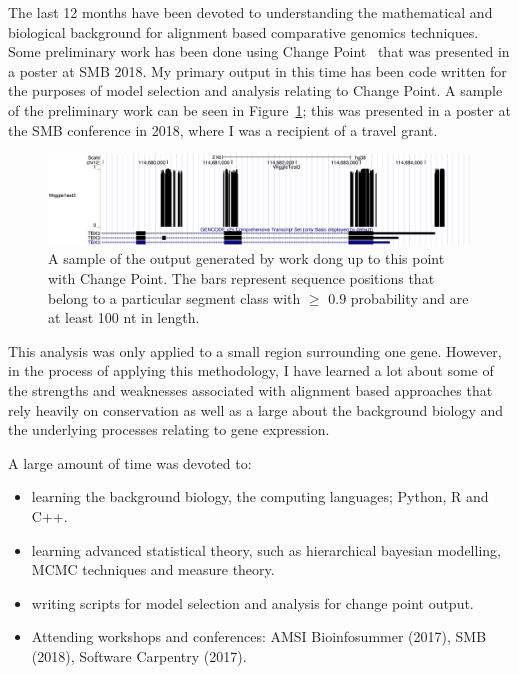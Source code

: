 
The last 12 months have been devoted to understanding the mathematical and biological background for alignment based comparative genomics techniques. Some preliminary work has been done using Change Point~\cite{keith2006segmenting} that was presented in a poster at SMB 2018. My primary output in this time has been code written for the purposes of model selection and analysis relating to Change Point. A sample of the preliminary work can be seen in Figure~\ref{fig:wigglel}; this was presented in a poster at the SMB conference in 2018, where I was a recipient of a travel grant.

\begin{figure}[H]
    \centering
    \includegraphics[width = \textwidth]{WiggleTrack1.pdf}
    \caption{A sample of the output generated by work dong up to this point with Change Point. The bars represent sequence positions that belong to a particular segment class with $\geq$ 0.9 probability and are at least 100 nt in length.}
    \label{fig:wigglel}
\end{figure}

This analysis was only applied to a small region surrounding one gene. However, in the process of applying this methodology, I have learned a lot about some of the strengths and weaknesses associated with alignment based approaches that rely heavily on conservation as well as a large about the background biology and the underlying processes relating to gene expression. 

A large amount of time was devoted to:
  \begin{itemize}
        \item learning the background biology, the computing languages; Python, R and C++.
        \item learning advanced statistical theory, such as hierarchical bayesian modelling, MCMC techniques and measure theory.
        \item writing scripts for model selection and analysis for change point output.
        \item Attending workshops and conferences: AMSI Bioinfosummer (2017), SMB (2018), Software Carpentry (2017).
    \end{itemize}
    